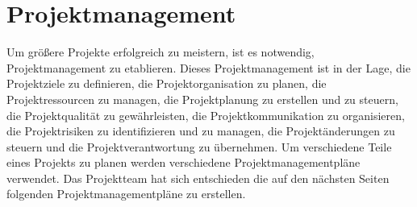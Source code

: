 \section{Projektmanagement}

Um größere Projekte erfolgreich zu meistern, ist es notwendig, Projektmanagement zu etablieren. Dieses Projektmanagement ist in der Lage, die Projektziele zu definieren, die Projektorganisation zu planen, die Projektressourcen zu managen, die Projektplanung zu erstellen und zu steuern, die Projektqualität zu gewährleisten, die Projektkommunikation zu organisieren, die Projektrisiken zu identifizieren und zu managen, die Projektänderungen zu steuern und die Projektverantwortung zu übernehmen. Um verschiedene Teile eines Projekts zu planen werden verschiedene Projektmanagementpläne verwendet. Das Projektteam hat sich entschieden die auf den nächsten Seiten folgenden Projektmanagementpläne zu erstellen. \cite{projektmanagement}

























